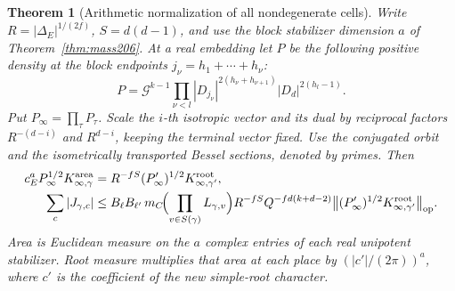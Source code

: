 \documentclass[a4paper,11pt]{article}
\newtheorem{theorem}[proposition]{Theorem}
\theoremstyle{definition}
\theoremstyle{remark}
\numberwithin{equation}{section}
\begin{document}
\begin{theorem}[Arithmetic normalization of all nondegenerate cells]
\label{thm:rd208}
Write \(R=|\Delta_E|^{1/(2f)}\), \(S=d(d-1)\), and use the
block stabilizer dimension \(a\) of Theorem~\ref{thm:mass206}.
At a real embedding let \(P\) be the following positive density
at the block endpoints \(j_\nu=h_1+\cdots+h_\nu\):
\[
        P=\mathcal G^{k-1}
            \prod_{\nu<l}|D_{j_\nu}|^{2(h_\nu+h_{\nu+1})}
                              |D_d|^{2(h_l-1)}.
\]
Put \(P_\infty=\prod_\tau P_\tau\). Scale the \(i\)-th isotropic
vector and its dual by reciprocal factors \(R^{-(d-i)}\) and
\(R^{d-i}\), keeping the terminal vector fixed. Use the conjugated
orbit and the isometrically transported Bessel sections, denoted
by primes. Then
\begin{align}
 c_E^a P_\infty^{1/2}K_{\infty,\gamma}^{\rm area}
       &=R^{-fS}(P'_\infty)^{1/2}K_{\infty,\gamma'}^{\rm root},
                                                        \label{eq:rd208}\\
 \sum_c|J_{\gamma,c}|
       &\le B_\ell B_{\ell'}\,m_C\!
         \Bigl(\prod_{v\in S(\gamma)}L_{\gamma,v}\Bigr)
         R^{-fS}Q^{-fd(k+d-2)}
         \big\|(P'_\infty)^{1/2}K_{\infty,\gamma'}^{\rm root}
                                             \big\|_{\rm op}. \notag
\end{align}
Area is Euclidean measure on the \(a\) complex entries of each
real unipotent stabilizer. Root measure multiplies that area at
each place by \((|c'|/(2\pi))^a\), where \(c'\) is the coefficient
of the new simple-root character.
\end{theorem}
\end{document}
